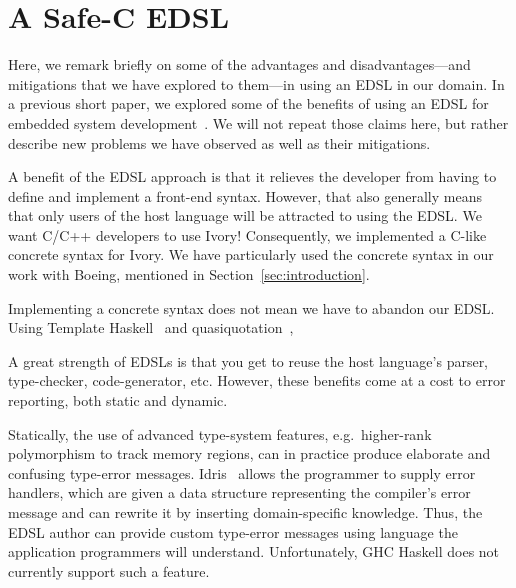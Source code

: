 \section{A Safe-C EDSL}
\label{sec:edsl}

Here, we remark briefly on some of the advantages and disadvantages---and
mitigations that we have explored to them---in using an EDSL in our domain. In a
previous short paper, we explored some of the benefits of using an EDSL for
embedded system development~\cite{smaccm}. We will not repeat those claims here,
but rather describe new problems we have observed as well as their mitigations.

A benefit of the EDSL approach is that it relieves the developer from having to
define and implement a front-end syntax. However, that also generally means that
only users of the host language will be attracted to using the
EDSL. We want C/C++ developers to use Ivory! Consequently, we implemented a
C-like concrete syntax for Ivory. We have particularly used the concrete syntax
in our work with Boeing, mentioned in Section~\ref{sec:introduction}.

Implementing a concrete syntax does not mean we have to abandon our EDSL. Using
Template Haskell~\cite{} and quasiquotation~\cite{}, 





A great strength of EDSLs is that you get to reuse the host language's parser,
type-checker, code-generator, etc. However, these benefits come at a cost to
error reporting, both static and dynamic. 

Statically, the use of advanced type-system features, e.g.\ higher-rank
polymorphism to track memory regions, can in practice produce elaborate and
confusing type-error messages. Idris~\cite{christiansen2014reflect} allows the
programmer to supply error handlers, which are given a data structure
representing the compiler's error message and can rewrite it by inserting
domain-specific knowledge. Thus, the EDSL author can provide custom type-error
messages using language the application programmers will
understand. Unfortunately, GHC Haskell does not currently support such a
feature.

